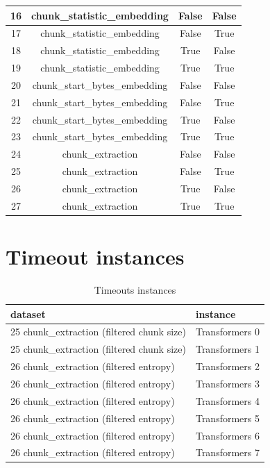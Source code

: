 \begin{longtable}{|c|c|c|c|}
\hline
16 & chunk\_statistic\_embedding & False & False \\
\hline
17 & chunk\_statistic\_embedding & False & True \\
\hline
18 & chunk\_statistic\_embedding & True & False \\
\hline
19 & chunk\_statistic\_embedding & True & True \\
\hline
20 & chunk\_start\_bytes\_embedding & False & False \\
\hline
21 & chunk\_start\_bytes\_embedding & False & True \\
\hline
22 & chunk\_start\_bytes\_embedding & True & False \\
\hline
23 & chunk\_start\_bytes\_embedding & True & True \\
\hline
24 & chunk\_extraction & False & False \\
\hline
25 & chunk\_extraction & False & True \\
\hline
26 & chunk\_extraction & True & False \\
\hline
27 & chunk\_extraction & True & True \\
\hline
\end{longtable}

\section{Timeout instances}

\label{sec:annexe:timeout_instances}

\begin{table}[H]
\centering
\begin{tabular}{ll}
\hline
dataset & instance \\ 
\hline
25 chunk\_extraction (filtered chunk size) & Transformers 0 \\ 
25 chunk\_extraction (filtered chunk size) & Transformers 1 \\ 
26 chunk\_extraction (filtered entropy) & Transformers 2 \\ 
26 chunk\_extraction (filtered entropy) & Transformers 3 \\ 
26 chunk\_extraction (filtered entropy) & Transformers 4 \\ 
26 chunk\_extraction (filtered entropy) & Transformers 5 \\ 
26 chunk\_extraction (filtered entropy) & Transformers 6 \\ 
26 chunk\_extraction (filtered entropy) & Transformers 7 \\ 
\hline
\end{tabular}
\caption{Timeouts instances}
\label{tab:timeouts}
\end{table}

